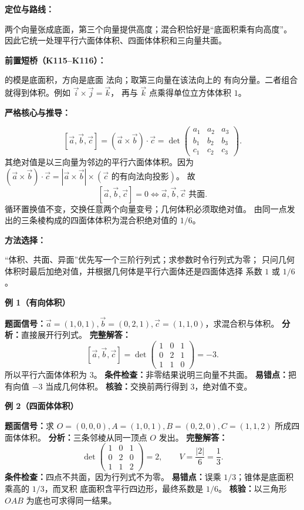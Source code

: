 \begin{knowledgeBox}
\textbf{定位与路线：}

两个向量张成底面，第三个向量提供高度；混合积恰好是“底面积乘有向高度”。
因此它统一处理平行六面体体积、四面体体积和三向量共面。

\textbf{前置短桥（K115--K116）：}

的模是底面积，方向是底面
法向；取第三向量在该法向上的
有向分量。二者组合就得到体积。例如 \(\vec i\times\vec j=\vec k\)，
再与 \(\vec k\) 点乘得单位立方体体积 \(1\)。

\textbf{严格核心与推导：}

\[
[\vec a,\vec b,\vec c]
=(\vec a\times\vec b)\cdot\vec c
=\det\begin{pmatrix}
a_1&a_2&a_3\\
b_1&b_2&b_3\\
c_1&c_2&c_3
\end{pmatrix}.
\]
其绝对值是以三向量为邻边的平行六面体体积。因为
\((\vec a\times\vec b)\cdot\vec c
=|\vec a\times\vec b|\times(\vec c\text{ 的有向法向投影})\)。
故
\[
[\vec a,\vec b,\vec c]=0
\Longleftrightarrow \vec a,\vec b,\vec c\text{ 共面}.
\]
循环置换值不变，交换任意两个向量变号；几何体积必须取绝对值。
由同一点发出的三条棱构成的四面体体积为混合积绝对值的 \(1/6\)。

\textbf{方法选择：}

“体积、共面、异面”优先写一个三阶行列式；求参数时令行列式为零；
只问几何体积时最后加绝对值，并根据几何体是平行六面体还是四面体选择
系数 \(1\) 或 \(1/6\)。

\textbf{例 1（有向体积）}

\textbf{题面信号：}\(\vec a=(1,0,1),\vec b=(0,2,1),
\vec c=(1,1,0)\)，求混合积与体积。
\textbf{分析：}直接展开行列式。
\textbf{完整解答：}
\[
[\vec a,\vec b,\vec c]
=\det\begin{pmatrix}1&0&1\\0&2&1\\1&1&0\end{pmatrix}
=-3.
\]
所以平行六面体体积为 \(3\)。
\textbf{条件检查：}非零结果说明三向量不共面。
\textbf{易错点：}把有向值 \(-3\) 当成几何体积。
\textbf{核验：}交换前两行得到 \(3\)，绝对值不变。

\textbf{例 2（四面体体积）}

\textbf{题面信号：}求 \(O=(0,0,0),A=(1,0,1),B=(0,2,0),
C=(1,1,2)\) 所成四面体体积。
\textbf{分析：}三条邻棱从同一顶点 \(O\) 发出。
\textbf{完整解答：}
\[
\det\begin{pmatrix}1&0&1\\0&2&0\\1&1&2\end{pmatrix}=2,
\qquad V=\frac{|2|}{6}=\frac13.
\]
\textbf{条件检查：}四点不共面，因为行列式不为零。
\textbf{易错点：}误乘 \(1/3\)；锥体是底面积乘高的 \(1/3\)，而叉积
底面积含平行四边形，最终系数是 \(1/6\)。
\textbf{核验：}以三角形 \(OAB\) 为底也可求得同一结果。


\end{knowledgeBox}

